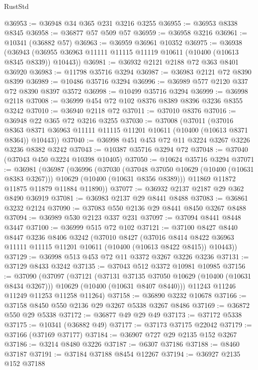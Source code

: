 \begin{lexlean}{RustStd}
\begin{coremodule}
@36953 := @36948 @34 @365 @231 @3216 @3255
@36955 := @36953 @8338 @8345
@36958 := @36877 @57 @509 @57
@36959 := @36958 @3216
@36961 := @10341 (@36882 @57)
@36963 := @36959 @36961 @10352
@36975 := @36938
    (@36943 (@36955 @36963 @11111 @11115 @11119 @10611 (@10400 (@10613 @8345 @8339)) @10443))
@36981 := @36932 @2121 @2188 @72 @363 @8401 @36920
@36983 := @11798 @35716 @3294
@36987 := @36983 @2121 @72 @8390 @8399
@36989 := @10486 @35716 @3294
@36996 := @36989 @577 @2120 @337 @72 @8390 @8397 @3572
@36998 := @10499 @35716 @3294
@36999 := @36998 @2118
@37008 := @36999 @454 @72 @102 @8376 @8389 @8396 @3236 @8355 @3242
@37010 := @36940 @2118 @72
@37011 := @37010 @8376
@37016 := @36948 @22 @365 @72 @3216 @3255
@37030 := @37008
    (@37011
      (@37016 @8363 @8371 @36963 @11111 @11115 @11201 @10611 (@10400 (@10613 @8371 @8364)) @10443))
@37040 := @36998 @451 @453 @72 @11 @3224 @3267 @3226 @3236 @8382 @3242
@37043 := @10387 @35716 @3294 @72
@37048 := @37040 (@37043 @450 @3224 @10398 @10405)
@37050 := @10624 @35716 @3294
@37071 := @36981
    (@36987
      (@36996
        (@37030
          (@37048 @37050 @10629 (@10400 (@10631 @8383 @3267)))
          @10629
          (@10400 (@10631 @8356 @8389)))
        @11869
        @11872
        @11875
        @11879
        @11884
        @11890))
@37077 := @36932 @2137 @2187 @29 @362 @8490 @36919
@37081 := @36983 @2137 @29 @8441 @8488
@37083 := @36861 @3232 @2124
@37090 := @37083 @550 @2136 @29 @8441 @8450 @3267 @8488
@37094 := @36989 @530 @2123 @337 @231
@37097 := @37094 @8441 @8448 @3447
@37100 := @36999 @515 @72 @102
@37121 := @37100
    @8427
    @8440
    @8447
    @3236
    @8406
    @3242
    (@37010
      @8427
      (@37016 @8414 @8422 @36963 @11111 @11115 @11201 @10611 (@10400 (@10613 @8422 @8415)) @10443))
@37129 := @36998 @513 @453 @72 @11 @3372 @3267 @3226 @3236
@37131 := @37129 @8433 @3242
@37135 := @37043 @512 @3372 @10981 @10985
@37156 := @37090
    (@37097
      (@37121
        (@37131 @37135 @37050 @10629 (@10400 (@10631 @8434 @3267)))
        @10629
        (@10400 (@10631 @8407 @8440)))
      @11243
      @11246
      @11249
      @11253
      @11258
      @11264)
@37158 := @36890 @3232 @10678
@37166 := @37158 @8450 @550 @2136 @29 @3267 @5338 @3267 @8486
@37169 := @36872 @550 @29 @5338
@37172 := @36877 @49 @29 @49
@37173 := @37172 @5338
@37175 := @10341 (@36882 @49)
@37177 := @37173 @37175 @22042
@37179 := @37166 (@37169 @37177)
@37184 := @36907 @727 @29 @2135 @152 @3267
@37186 := @3214 @8480 @3226
@37187 := @6307 @37186
@37188 := @8460 @37187
@37191 := @37184 @37188 @8454 @12267
@37194 := @36927 @2135 @152 @37188

\end{coremodule}
\end{lexlean}
